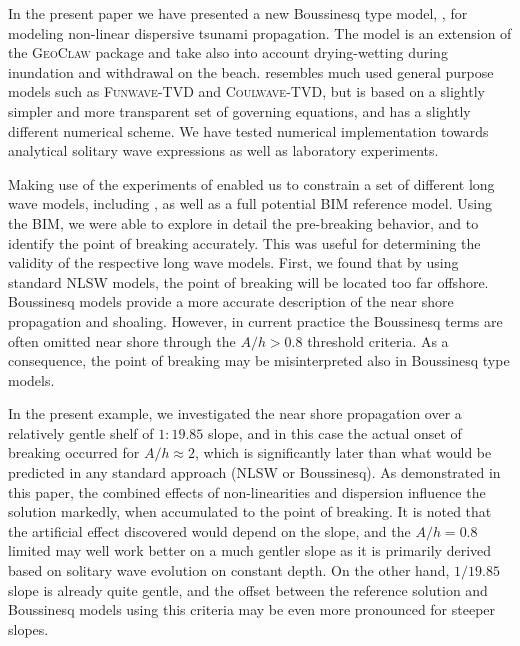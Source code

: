 In the present paper we have presented a new  
Boussinesq type model, \BoussClawt,
for modeling non-linear dispersive tsunami propagation. The model is an extension of the \textsc{GeoClaw} package and  take also into account drying-wetting during inundation and withdrawal on the beach.
\BoussClaw resembles much used general purpose models such as \textsc{Funwave-TVD} and
\textsc{Coulwave-TVD}, but is based on a slightly simpler and more transparent set of governing equations,
and has a slightly different numerical scheme. We have tested numerical implementation towards
analytical solitary wave expressions as well as laboratory experiments.

Making use of the experiments of \citet{synolakis1987runup} 
enabled us to
constrain a set of different long wave models, including \BoussClawt, as well as a full potential
BIM reference model. Using the BIM, we were able to explore in detail the pre-breaking behavior,
and to identify the point of breaking accurately. This was useful for determining the 
validity of the respective long wave models. First, we found that by using standard NLSW models,
the point of breaking will be located too far offshore. Boussinesq models
provide  a more accurate description of the near shore propagation and shoaling. 
However, in current practice the Boussinesq terms are often omitted near shore through the $A/h>0.8$ threshold criteria.
As a consequence, the point of breaking may be misinterpreted also in Boussinesq type models.

In the present example, we investigated the near shore propagation over a relatively gentle shelf of $1:19.85$ slope,
and in this case the actual onset of breaking occurred for $A/h \approx 2$, which is significantly later
than what would be predicted in any standard approach (NLSW or Boussinesq). As demonstrated in this paper,
the combined effects of non-linearities and dispersion influence the solution markedly, when accumulated to the point
of breaking. It is noted that the artificial effect discovered would depend on the slope, 
and the $A/h=0.8$ limited may well work better on a much gentler slope as it is primarily derived based on 
solitary wave evolution on constant depth. On the other hand, $1/19.85$ slope is already quite gentle,
and the offset between the reference solution and Boussinesq models using this criteria may
be even more pronounced for steeper slopes.


